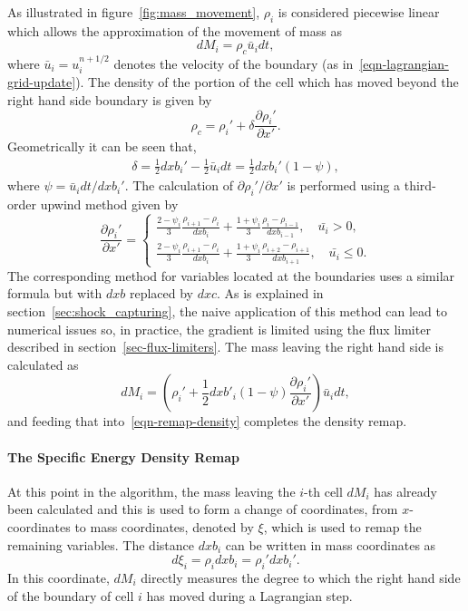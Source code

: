 As illustrated in figure~\ref{fig:mass_movement}, $\rho_i$ is considered piecewise linear which allows the approximation of the movement of mass as
\begin{equation}
  dM_i = \rho_c \bar{u}_i dt,
\end{equation}
where $\bar{u}_i = u_i^{n+1/2}$ denotes the velocity of the boundary (as in~\eqref{eqn-lagrangian-grid-update}). The density of the portion of the cell which has moved beyond the right hand side boundary is given by
\begin{equation}
  \rho_c = \rho_i' + \delta \frac{\partial \rho_i'}{\partial x'}.
\end{equation}
Geometrically it can be seen that,
\begin{align}
  \delta =  \frac{1}{2} dxb_i' - \frac{1}{2} \bar{u}_i dt = \frac{1}{2} dxb_i'(1-\psi),
\end{align}
where $\psi = \bar{u}_i dt / dxb_i'$. The calculation of $\partial\rho_i'/ \partial x'$ is performed using a third-order upwind method given by
\begin{equation}
  \label{eq:upwind_method}
\frac{\partial \rho_i'}{\partial x'} = 
\begin{cases}
\frac{2-\psi_i}{3} \frac{\rho_{i+1} - \rho_i}{dxb_i} + \frac{1+\psi_i}{3}\frac{\rho_i - \rho_{i-1}}{dxb_{i-1}}, \quad \bar{u_i} > 0,\\
\frac{2-\psi_i}{3} \frac{\rho_{i+1} - \rho_i}{dxb_i} + \frac{1+\psi_i}{3}\frac{\rho_{i+2} - \rho_{i+1}}{dxb_{i+1}}, \quad \bar{u_i} \leq 0.
\end{cases}
\end{equation}
The corresponding method for variables located at the boundaries uses a similar formula but with $dxb$ replaced by $dxc$. As is explained in section~\ref{sec:shock_capturing}, the naive application of this method can lead to numerical issues so, in practice, the gradient is limited using the flux limiter described in section~\ref{sec-flux-limiters}. The mass leaving the right hand side is calculated as
\begin{equation}
dM_i = \left( \rho_i' + \frac{1}{2}dxb'_i(1-\psi) \frac{\partial \rho_i'}{\partial x'} \right) \bar{u}_i dt,
\label{eqn-remap-mass-diff}
\end{equation} 
and feeding that into~\eqref{eqn-remap-density} completes the density remap.

\paragraph{The Specific Energy Density Remap}
At this point in the algorithm, the mass leaving the $i$-th cell $dM_i$ has already been calculated and this is used to form a change of coordinates, from $x$-coordinates to mass coordinates, denoted by $\xi$, which is used to remap the remaining variables. The distance $dxb_i$ can be written in mass coordinates as
\begin{equation}
\label{eqn-change-of-coord}
  d\xi_i = \rho_i dxb_i = \rho_i' dxb_i'.
\end{equation}
In this coordinate, $dM_i$ directly measures the degree to which the right hand side of the boundary of cell $i$ has moved during a Lagrangian step.


